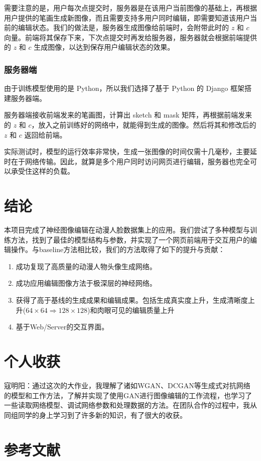 \documentclass[a4paper,12pt,UTF8]{ctexart}
\begin{document}
需要注意的是，用户每次点提交时，服务器是在该用户当前图像的基础上，再根据用户提供的笔画生成新图像，而且需要支持多用户同时编辑，即需要知道该用户当前的编辑状态。我们的做法是，服务器生成图像给前端时，会附带此时的 $z$ 和 $c$ 向量。前端将其保存下来，下次点提交时再发给服务器，服务器就会根据前端提供的 $z$ 和 $c$ 生成图像，以达到保存用户编辑状态的效果。

\subsubsection{服务器端}
由于训练模型使用的是 Python，所以我们选择了基于 Python 的 Django 框架搭建服务器端。

服务器端接收前端发来的笔画图，计算出 sketch 和 mask 矩阵，再根据前端发来的 $z$ 和 $c$，放入之前训练好的网络中，就能得到生成的图像。然后将其和修改后的 $z$ 和 $c$ 返回给前端。

实际测试时，模型的运行效率非常快，生成一张图像的时间仅需十几毫秒，主要延时在于网络传输。因此，就算是多个用户同时访问网页进行编辑，服务器也完全可以承受住这样的负载。

\section{结论}

本项目完成了神经图像编辑在动漫人脸数据集上的应用。我们尝试了多种模型与训练方法，找到了最佳的模型结构与参数，并实现了一个网页前端用于交互用户的编辑操作。与baseline方法相比较，我们的方法取得了如下的提升与贡献：

\begin{enumerate}
\item 成功复现了高质量的动漫人物头像生成网络。
\item 成功应用编辑图像方法于极深层的神经网络。
\item 获得了高于基线的生成成果和编辑成果。包括生成真实度上升，生成清晰度上升($64 \times 64 \Rightarrow 128 \times 128$)和肉眼可见的编辑质量上升
\item 基于Web/Server的交互界面。
\end{enumerate}

\section{个人收获}

寇明阳：通过这次的大作业，我理解了诸如WGAN、DCGAN等生成式对抗网络的模型和工作方法，了解并实现了使用GAN进行图像编辑的工作流程，也学习了一些读取网络模型、调试网络参数和处理数据的方法。在团队合作的过程中，我从同组同学的身上学习到了许多新的知识，有了很大的收获。

\section*{参考文献}

\medskip

{\small


}
\end{document}
